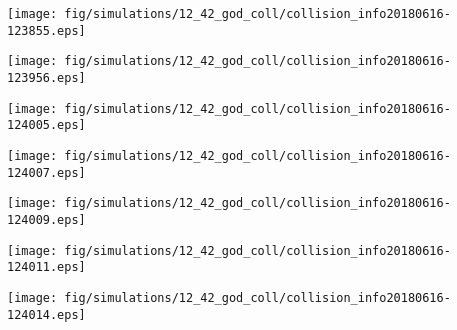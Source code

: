 \texttt{[image: fig/simulations/12\_42\_god\_coll/collision\_info20180616-123855.eps]}

\texttt{[image: fig/simulations/12\_42\_god\_coll/collision\_info20180616-123956.eps]}

\texttt{[image: fig/simulations/12\_42\_god\_coll/collision\_info20180616-124005.eps]}

\texttt{[image: fig/simulations/12\_42\_god\_coll/collision\_info20180616-124007.eps]}

\texttt{[image: fig/simulations/12\_42\_god\_coll/collision\_info20180616-124009.eps]}

\texttt{[image: fig/simulations/12\_42\_god\_coll/collision\_info20180616-124011.eps]}

\texttt{[image: fig/simulations/12\_42\_god\_coll/collision\_info20180616-124014.eps]}

